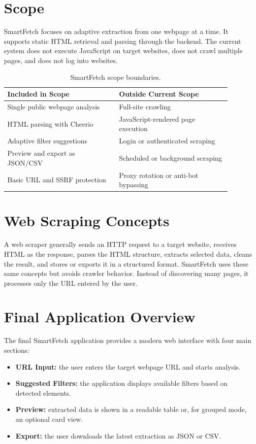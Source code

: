\documentclass[11pt,a4paper]{article}
\begin{document}
\section{Scope}

SmartFetch focuses on adaptive extraction from one webpage at a time. It supports static HTML retrieval and parsing through the backend. The current system does not execute JavaScript on target websites, does not crawl multiple pages, and does not log into websites.

\begin{table}[h]
\centering
\begin{tabular}{p{0.45\linewidth}p{0.45\linewidth}}
\toprule
\textbf{Included in Scope} & \textbf{Outside Current Scope} \\
\midrule
Single public webpage analysis & Full-site crawling \\
HTML parsing with Cheerio & JavaScript-rendered page execution \\
Adaptive filter suggestions & Login or authenticated scraping \\
Preview and export as JSON/CSV & Scheduled or background scraping \\
Basic URL and SSRF protection & Proxy rotation or anti-bot bypassing \\
\bottomrule
\end{tabular}
\caption{SmartFetch scope boundaries.}
\end{table}

\section{Web Scraping Concepts}

A web scraper generally sends an HTTP request to a target website, receives HTML as the response, parses the HTML structure, extracts selected data, cleans the result, and stores or exports it in a structured format. SmartFetch uses these same concepts but avoids crawler behavior. Instead of discovering many pages, it processes only the URL entered by the user.

\section{Final Application Overview}

The final SmartFetch application provides a modern web interface with four main sections:

\begin{itemize}
  \item \textbf{URL Input:} the user enters the target webpage URL and starts analysis.
  \item \textbf{Suggested Filters:} the application displays available filters based on detected elements.
  \item \textbf{Preview:} extracted data is shown in a readable table or, for grouped mode, an optional card view.
  \item \textbf{Export:} the user downloads the latest extraction as JSON or CSV.
\end{itemize}
\end{document}
